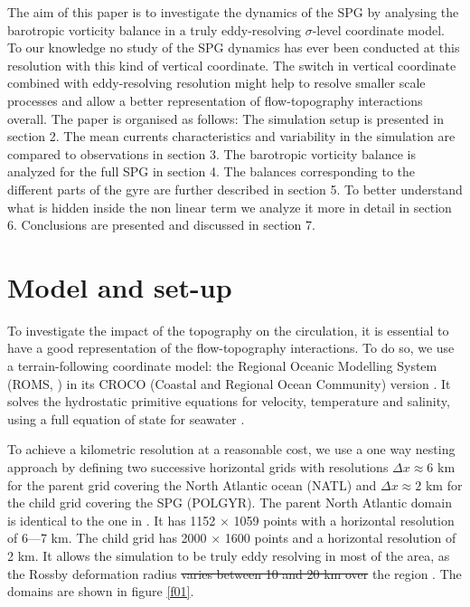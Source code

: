 \documentclass[os, manuscript]{copernicus}
\providecommand{\DIFadd}[1]{{\protect\color{blue}\uwave{#1}}} %
\providecommand{\DIFdel}[1]{{\protect\color{red}\sout{#1}}}                      %
\providecommand{\DIFaddbegin}{} %
\providecommand{\DIFaddend}{} %
\providecommand{\DIFdelbegin}{} %
\providecommand{\DIFdelend}{} %
\begin{document}
The aim of this paper is to investigate the dynamics of the SPG by analysing the barotropic vorticity balance in a truly eddy-resolving $\sigma$-level coordinate model. To our knowledge no study of the SPG dynamics has ever been conducted at this resolution with this kind of vertical coordinate. The switch in vertical coordinate combined with eddy-resolving resolution might help to resolve smaller scale processes and allow a better representation of flow-topography interactions overall. The paper is organised as follows: The simulation setup is presented in section 2. The mean currents characteristics and variability in the simulation are compared to observations in section 3. The barotropic vorticity balance is analyzed for the full SPG in section 4. The balances corresponding to the different parts of the gyre are further described in section 5. To better understand what is hidden inside the non linear term we analyze it more in detail in section 6. Conclusions are presented and discussed in section 7.  

\section{Model and set-up}
To investigate the impact of the topography on the circulation, it is essential to have a good representation of the flow-topography interactions. To do so, we use a terrain-following coordinate model: the Regional Oceanic Modelling System (ROMS, \citet{shchepetkin2009}) in its CROCO (Coastal and Regional Ocean Community) version \citep{debreu2012}. It solves the hydrostatic primitive equations for velocity, temperature and salinity, using a full equation of state for seawater \citep{shchepetkin2009,shchepetkin2011}. 

To achieve a kilometric resolution at a reasonable cost, we use a one way nesting approach by defining two successive horizontal grids with resolutions $\Delta x \approx 6$ km for the parent grid covering the North Atlantic ocean (NATL) and $\Delta x \approx 2$ km for the child grid covering the SPG (POLGYR). The parent North Atlantic domain is identical to the one in \cite{renault2016}. It has 1152 $\times$ 1059 points  with a horizontal resolution of 6---7 km. The child grid has 2000 $\times$ 1600 points and a horizontal resolution of 2 km. It allows the simulation to be truly eddy resolving in most of the area, as the \DIFaddbegin \DIFadd{first }\DIFaddend Rossby deformation radius \DIFdelbegin \DIFdel{varies between 10 and 20 km over }\DIFdelend \DIFaddbegin \DIFadd{remains below 10-km over most of }\DIFaddend the region \citep{chelton1998}. The domains are shown in figure \ref{f01}. 
\end{document}
